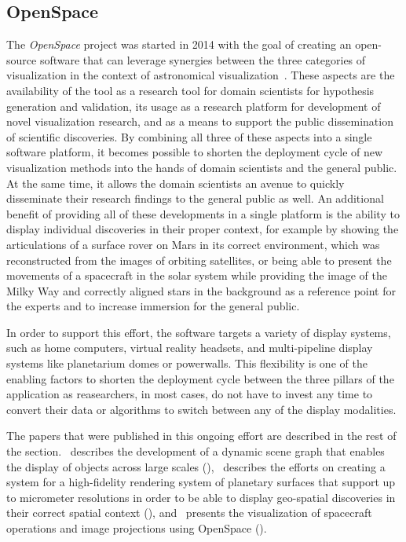\subsection{OpenSpace} \label{contributions:astro:openspace}
The \emph{OpenSpace} project was started in 2014 with the goal of creating an open-source software that can leverage synergies between the three categories of visualization in the context of astronomical visualization~\cite{bock17openspace}.  These aspects are the availability of the tool as a research tool for domain scientists for hypothesis generation and validation, its usage as a research platform for development of novel visualization research, and as a means to support the public dissemination of scientific discoveries.  By combining all three of these aspects into a single software platform, it becomes possible to shorten the deployment cycle of new visualization methods into the hands of domain scientists and the general public.  At the same time, it allows the domain scientists an avenue to quickly disseminate their research findings to the general public as well.  An additional benefit of providing all of these developments in a single platform is the ability to display individual discoveries in their proper context, for example by showing the articulations of a surface rover on Mars in its correct environment, which was reconstructed from the images of orbiting satellites, or being able to present the movements of a spacecraft in the solar system while providing the image of the Milky Way and correctly aligned stars in the background as a reference point for the experts and to increase immersion for the general public.

In order to support this effort, the software targets a variety of display systems, such as home computers, virtual reality headsets, and multi-pipeline display systems like planetarium domes or powerwalls.  This flexibility is one of the enabling factors to shorten the deployment cycle between the three pillars of the application as reasearchers, in most cases, do not have to invest any time to convert their data or algorithms to switch between any of the display modalities.

The papers that were published in this ongoing effort are described in the rest of the section.  \paperDSG\ describes the development of a dynamic scene graph that enables the display of objects across large scales (), \paperGB\ describes the efforts on creating a system for a high-fidelity rendering system of planetary surfaces that support up to micrometer resolutions in order to be able to display geo-spatial discoveries in their correct spatial context (), and \paperOS\ presents the visualization of spacecraft operations and image projections using OpenSpace ().





